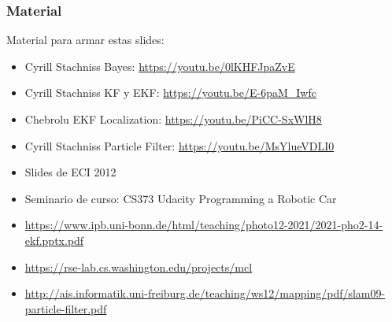 \begin{frame}
    \frametitle{Material}
    
    Material para armar estas slides:
    \begin{itemize}
        \item Cyrill Stachniss Bayes: \url{https://youtu.be/0lKHFJpaZvE} 
        \item Cyrill Stachniss KF y EKF: \url{https://youtu.be/E-6paM_Iwfc}
        \item Chebrolu EKF Localization: \url{https://youtu.be/PiCC-SxWlH8}
        \item Cyrill Stachniss Particle Filter: \url{https://youtu.be/MsYlueVDLI0}
        \item Slides de ECI 2012
        \item Seminario de curso: CS373 Udacity Programming a Robotic Car
        \item \url{https://www.ipb.uni-bonn.de/html/teaching/photo12-2021/2021-pho2-14-ekf.pptx.pdf}
        \item \url{https://rse-lab.cs.washington.edu/projects/mcl}
        \item \url{http://ais.informatik.uni-freiburg.de/teaching/ws12/mapping/pdf/slam09-particle-filter.pdf}
    \end{itemize}
    
\end{frame}

